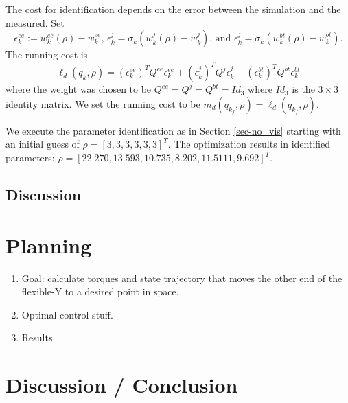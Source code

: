 \documentclass[runningheads,a4paper]{llncs}
\begin{document}
The cost for identification depends on the error between the simulation and the measured. Set
\[
\epsilon^{ee}_k := w^{ee}_k(\rho)-\overline{w}^{ee}_k \textrm{, } \epsilon^{j}_k = \sigma_k(w^j_k(\rho)-\overline{w}^j_k) \textrm{, and } \epsilon^{j}_k = \sigma_k(w^{bt}_k(\rho)-\overline{w}^{bt}_k).
\]
The running cost is 
\[
\ell_d(q_k,\rho) = (\epsilon^{ee}_k)^TQ^{ee}\epsilon^{ee}_k + (\epsilon^{j}_k)^TQ^{j}\epsilon^{j}_k + (\epsilon^{bt}_k)^TQ^{bt}\epsilon^{bt}_k
\]
where the weight was chosen to be $Q^{ee} = Q^{j} = Q^{bt} = Id_{3}$ where $Id_{3}$ is the $3\times3$ identity matrix.  We set the running cost to be $m_d(q_{k_f},\rho) = \ell_d(q_{k_f},\rho)$.

We execute the parameter identification as in Section \ref{sec-no_vis} starting with an initial guess of $\rho = [3, 3, 3, 3, 3, 3]^T$. The optimization results in identified parameters: $\rho = [22.270 , 13.593 , 10.735 ,  8.202  ,11.5111,   9.692]^T$.

\subsection{Discussion}



\section{Planning \label{sec-planning}}
\begin{enumerate}
\item Goal: calculate torques and state trajectory that moves the other end of the flexible-Y to a desired point in space.
\item Optimal control stuff.
\item Results.
\end{enumerate}

\section{Discussion / Conclusion \label{sec-conc}}




\end{document}
